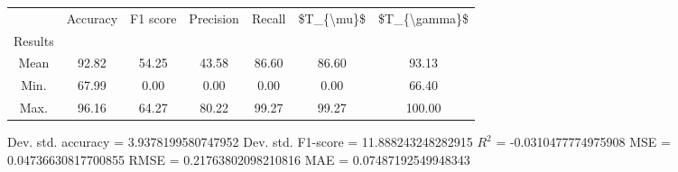 \begin{tabular}{|c|c|c|c|c|c|c|}
\toprule
{} &  Accuracy &  F1 score &  Precision &  Recall &  \$T\_\{\textbackslash mu\}\$ &  \$T\_\{\textbackslash gamma\}\$ \\
Results &           &           &            &         &            &               \\
\hline
Mean    &     92.82 &     54.25 &      43.58 &   86.60 &      86.60 &         93.13 \\
Min.    &     67.99 &      0.00 &       0.00 &    0.00 &       0.00 &         66.40 \\
Max.    &     96.16 &     64.27 &      80.22 &   99.27 &      99.27 &        100.00 \\
\bottomrule
\end{tabular}

 Dev. std. accuracy = 3.9378199580747952
 Dev. std. F1-score = 11.888243248282915
 $R^2$ = -0.0310477774975908
 MSE = 0.04736630817700855
 RMSE = 0.21763802098210816
 MAE = 0.07487192549948343